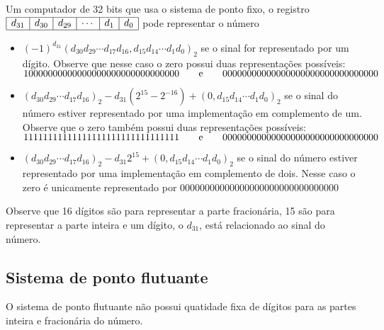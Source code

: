 \begin{ex} Um computador de 32 bits que usa o sistema de ponto fixo, o registro
$
\begin{array}{|c|c|c|c|c|c|} \hline
d_{31}&d_{30}&d_{29}&\cdots&d_1&d_0\\\hline
\end{array}
$
pode representar o número
\begin{itemize}
\item $(-1)^{d_{31}}(d_{30}d_{29}\cdots d_{17}d_{16},d_{15}d_{14}\cdots d_1d_0)_2$
se o sinal for representado por um dígito. Observe que nesse caso o zero possui duas representações possíveis: 
$
10000000000000000000000000000000\qquad \hbox{e}\qquad 00000000000000000000000000000000
$
\item $(d_{30}d_{29}\cdots d_{17}d_{16})_2-d_{31}(2^{15}-2^{-16})+(0,d_{15}d_{14}\cdots d_1d_0)_2$
se o sinal do número estiver representado por uma implementação em complemento de um. Observe que o zero também possui duas representações possíveis: 
$
11111111111111111111111111111111\qquad \hbox{e}\qquad 00000000000000000000000000000000
$
\item $(d_{30}d_{29}\cdots d_{17}d_{16})_2-d_{31}2^{15}+(0,d_{15}d_{14}\cdots d_1d_0)_2$
se o sinal do número estiver representado por uma implementação em complemento de dois. Nesse caso o zero é unicamente representado por
$
00000000000000000000000000000000
$
\end{itemize}



Observe que 16 dígitos são para representar a parte fracionária, 15 são para representar a parte inteira e um dígito, o $d_{31}$, está relacionado ao sinal do número. 
\end{ex}

\subsection{Sistema de ponto flutuante}
O sistema de ponto flutuante não possui quatidade fixa de dígitos para as partes inteira e fracionária do número. 

